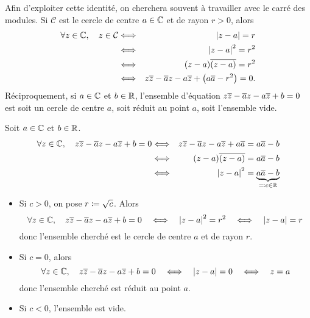 \documentclass{magnolia}
\begin{document}
\begin{remarques}
\remarque Afin d'exploiter cette identité, on cherchera souvent à travailler avec le carré des modules.
\remarque Si $\mathcal{C}$ est le cercle de centre $a\in\mathbb{C}$ et de rayon $r>0$, alors
  \begin{eqnarray*}
  \forall z\in\mathbb{C},\quad z\in\mathcal{C}
  &\Longleftrightarrow& \left|z-a\right|=r\\
  &\Longleftrightarrow& \left|z-a\right|^2=r^2\\
  &\Longleftrightarrow& (z-a)\overline{(z-a)}=r^2\\
  &\Longleftrightarrow& z\overline{z}-\overline{a}z-a\overline{z}+\left(a\overline{a}-r^2\right)=0.
  \end{eqnarray*}
  Réciproquement, si $a\in\mathbb{C}$ et $b\in\mathbb{R}$, l'ensemble d'équation $z\overline{z}-\overline{a}z-a\overline{z}+b=0$ est soit un cercle de centre $a$, soit réduit au point $a$, soit l'ensemble vide.
  \begin{sol}
Soit $a\in\mathbb{C}$ et $b\in\mathbb{R}$.
\begin{eqnarray*}
\forall z\in\mathbb{C},\quad z\overline{z}-\overline{a}z-a\overline{z}+b=0
&\Longleftrightarrow& z\overline{z}-\overline{a}z-a\overline{z}+a\overline{a}=a\overline{a}-b\\
&\Longleftrightarrow& (z-a)\overline{(z-a)}=a\overline{a}-b\\
&\Longleftrightarrow& \left|z-a\right|^2=\underbrace{a\overline{a}-b}_{\eqqcolon c\in\mathbb{R}}
\end{eqnarray*}
\begin{itemize}
\item Si $c>0$, on pose $r\coloneqq\sqrt{c}$. Alors
  \[\forall z\in\mathbb{C},\quad z\overline{z}-\overline{a}z-a\overline{z}+b=0 \quad\Longleftrightarrow\quad \left|z-a\right|^2=r^2 \quad\Longleftrightarrow\quad \left|z-a\right|=r\]
  donc l'ensemble cherché est le cercle de centre $a$ et de rayon $r$.
\item Si $c=0$, alors
  \[\forall z\in\mathbb{C},\quad z\overline{z}-\overline{a}z-a\overline{z}+b=0 \quad\Longleftrightarrow\quad \left|z-a\right|=0 \quad\Longleftrightarrow\quad z=a\]
  donc l'ensemble cherché est réduit au point $a$.
\item Si $c<0$, l'ensemble est vide.
\end{itemize}
  \end{sol}
\end{remarques}

\end{document}
